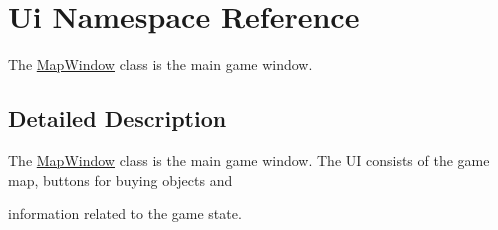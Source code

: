\hypertarget{namespaceUi}{\section{Ui Namespace Reference}
\label{namespaceUi}
}


The \hyperlink{classMapWindow}{Map\-Window} class is the main game window.  




\subsection{Detailed Description}
The \hyperlink{classMapWindow}{Map\-Window} class is the main game window. The U\-I consists of the game map, buttons for buying objects and \par
information related to the game state. 